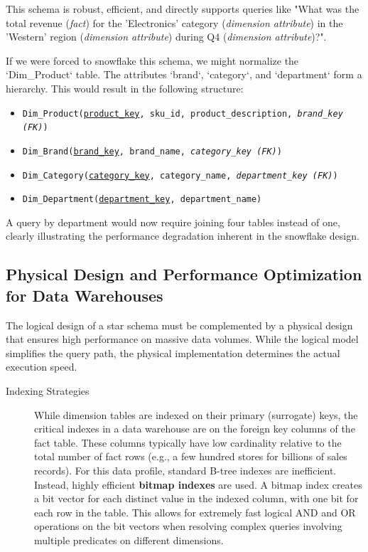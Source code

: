 \begin{description}
This schema is robust, efficient, and directly supports queries like "What was the total revenue (\textit{fact}) for the 'Electronics' category (\textit{dimension attribute}) in the 'Western' region (\textit{dimension attribute}) during Q4 (\textit{dimension attribute})?".

If we were forced to snowflake this schema, we might normalize the `Dim\_Product` table. The attributes `brand`, `category`, and `department` form a hierarchy. This would result in the following structure:
\begin{itemize}
    \item \texttt{Dim\_Product(\underline{product\_key}, sku\_id, product\_description, \textit{brand\_key (FK)})}
    \item \texttt{Dim\_Brand(\underline{brand\_key}, brand\_name, \textit{category\_key (FK)})}
    \item \texttt{Dim\_Category(\underline{category\_key}, category\_name, \textit{department\_key (FK)})}
    \item \texttt{Dim\_Department(\underline{department\_key}, department\_name)}
\end{itemize}
A query by department would now require joining four tables instead of one, clearly illustrating the performance degradation inherent in the snowflake design.

\subsection{Physical Design and Performance Optimization for Data Warehouses}
The logical design of a star schema must be complemented by a physical design that ensures high performance on massive data volumes. While the logical model simplifies the query path, the physical implementation determines the actual execution speed.
\begin{description}
    \item[Indexing Strategies] While dimension tables are indexed on their primary (surrogate) keys, the critical indexes in a data warehouse are on the foreign key columns of the fact table. These columns typically have low cardinality relative to the total number of fact rows (e.g., a few hundred stores for billions of sales records). For this data profile, standard B-tree indexes are inefficient. Instead, highly efficient \textbf{bitmap indexes} are used. A bitmap index creates a bit vector for each distinct value in the indexed column, with one bit for each row in the table. This allows for extremely fast logical AND and OR operations on the bit vectors when resolving complex queries involving multiple predicates on different dimensions.


\end{description}
\end{description}
